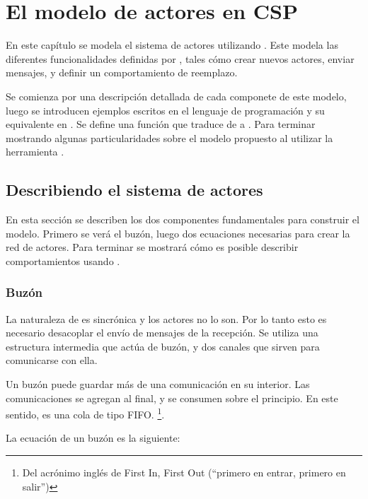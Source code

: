 \chapter{El modelo de actores en CSP}
En este capítulo se modela el sistema de actores utilizando \CSP. Este modela las diferentes funcionalidades definidas por \SAL, tales cómo crear nuevos actores, enviar mensajes, y definir un comportamiento de reemplazo. 

Se comienza por una descripción detallada de cada componete de este modelo, luego se introducen ejemplos escritos en el lenguaje de programación \SAL y su equivalente en \CSP. Se define una función que traduce de \SAL a \CSP. Para terminar mostrando algunas particularidades sobre el modelo propuesto al utilizar la herramienta \FDR.

\section{Describiendo el sistema de actores} 
En esta sección se describen los dos componentes fundamentales para construir el modelo. Primero se verá el buzón, luego dos ecuaciones necesarias para crear la red de actores. Para terminar se mostrará cómo es posible describir comportamientos usando \CSP. 


\subsection{Buzón}\label{modelo:buzon}

La naturaleza de \CSP es sincrónica y los actores no lo son. Por lo tanto esto es necesario desacoplar el envío de mensajes de la recepción. Se utiliza una estructura intermedia que actúa de buzón, y dos canales que sirven para comunicarse con ella.

Un buzón puede guardar más de una comunicación en su interior. Las comunicaciones se agregan al final, y se consumen sobre el principio. En este sentido, es una cola de tipo FIFO. \footnote{Del acrónimo inglés de First In, First Out (``primero en entrar, primero en salir'')}.

La ecuación de un buzón es la siguiente:


